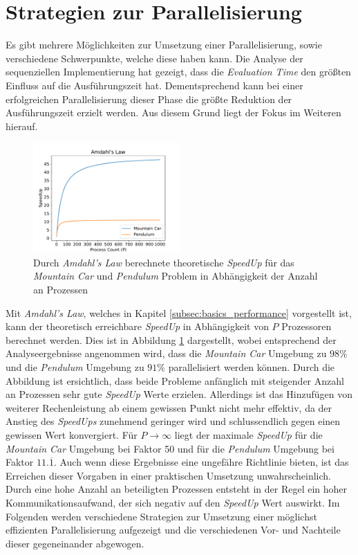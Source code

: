 \section{Strategien zur Parallelisierung}
\label{sec:parallel_strategies}
Es gibt mehrere Möglichkeiten zur Umsetzung einer Parallelisierung, sowie verschiedene Schwerpunkte, welche diese haben kann. Die Analyse der sequenziellen Implementierung hat gezeigt, dass die \emph{Evaluation Time} den größten Einfluss auf die Ausführungszeit hat.  Dementsprechend kann bei einer erfolgreichen Parallelisierung dieser Phase die größte Reduktion der Ausführungszeit erzielt werden. Aus diesem Grund liegt der Fokus im Weiteren hierauf. 
\begin{figure}[!h]
	\centering
	\includegraphics[width=0.5\textwidth]{./img/ahmdals_law_mountain_pendulum.pdf} 
	\caption{Durch \emph{Amdahl's Law} berechnete theoretische \emph{SpeedUp} für das \emph{Mountain Car} und \emph{Pendulum} Problem in Abhängigkeit der Anzahl an Prozessen}
	\label{fig:amdahls_law_mountain_pendulum}
\end{figure}
Mit \emph{Amdahl's Law}, welches in Kapitel \ref{subsec:basics_performance} vorgestellt ist, kann der theoretisch erreichbare \emph{SpeedUp} in Abhängigkeit von $P$ Prozessoren berechnet werden. Dies ist in Abbildung \ref{fig:amdahls_law_mountain_pendulum} dargestellt, wobei entsprechend der Analyseergebnisse angenommen wird, dass die \emph{Mountain Car} Umgebung zu $98\%$ und die \emph{Pendulum} Umgebung zu $91\%$ parallelisiert werden können. Durch die Abbildung ist ersichtlich, dass beide Probleme anfänglich mit steigender Anzahl an Prozessen sehr gute \emph{SpeedUp} Werte erzielen. Allerdings ist das Hinzufügen von weiterer Rechenleistung ab einem gewissen Punkt nicht mehr effektiv, da der Anstieg des \emph{SpeedUps} zunehmend geringer wird und schlussendlich gegen einen gewissen Wert konvergiert. Für $P \rightarrow \infty$ liegt der maximale \emph{SpeedUp} für die \emph{Mountain Car} Umgebung bei Faktor 50 und für die \emph{Pendulum} Umgebung bei Faktor $11.\overline{1}$. Auch wenn diese Ergebnisse eine ungefähre Richtlinie bieten, ist das Erreichen dieser Vorgaben in einer praktischen Umsetzung unwahrscheinlich. Durch eine hohe Anzahl an beteiligten Prozessen entsteht in der Regel ein hoher Kommunikationsaufwand, der sich negativ auf den \emph{SpeedUp} Wert auswirkt. Im Folgenden werden verschiedene Strategien zur Umsetzung einer möglichst effizienten Parallelisierung aufgezeigt und die verschiedenen Vor- und Nachteile dieser gegeneinander abgewogen.
